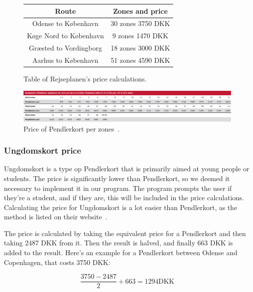 \begin{figure}[H]
    \centering
    \noindent
    \begin{tabular}{ || c | c || }
        \hline
        Route & Zones and price \\
        \hline\hline
        Odense to København & 30 zones 3750 DKK \\
        \hline
        Køge Nord to København & 9 zones 1470 DKK \\
        \hline
        Græsted to Vordingborg & 18 zones 3000 DKK \\
        \hline
        Aarhus to København & 51 zones 4590 DKK \\
        \hline
    \end{tabular}
    \caption{Table of Rejseplanen's price calculations.}
    \label{fig:table-rejseplanen-price-calculations}
\end{figure}

\begin{figure}[H]
    \centering
    \includegraphics[width=1\textwidth]{images/dsb-pendlerkort-pris.jpg}
    \caption{Price of Pendlerkort per zones~\cite{price_sheet}.}
    \label{fig:image-dsb-pendlerkort-pris}
\end{figure}

\subsubsection{Ungdomskort price}

Ungdomskort is a type op Pendlerkort that is primarily aimed at young people or students.
The price is significantly lower than Pendlerkort, so we deemed it necessary to implement it in our program.
The program prompts the user if they're a student, and if they are, this will be included in the price calculations.
Calculating the price for Ungdomskort is a lot easier than Pendlerkort, as the method is listed on their
website~\cite{price_ung}.

The price is calculated by taking the equivalent price for a Pendlerkort and then taking 2487 DKK from it.
Then the result is halved, and finally 663 DKK is added to the result.
Here's an example for a Pendlerkort between Odense and Copenhagen, that costs 3750 DKK:

\begin{equation}
    \frac{3750 - 2487}{2} + 663 = 1294 \text{DKK}
\end{equation}

